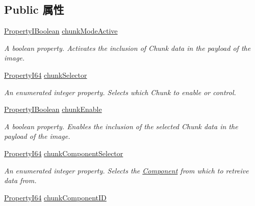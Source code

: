 \subsection*{Public 属性}
\begin{DoxyCompactItemize}
\item 
\hyperlink{group___common_interface_ga44f9437e24b21b6c93da9039ec6786aa}{Property\+I\+Boolean} \hyperlink{classmv_i_m_p_a_c_t_1_1acquire_1_1_gen_i_cam_1_1_chunk_data_control_aae91a9b1196e832dccef5e078a75c2ee}{chunk\+Mode\+Active}
\begin{DoxyCompactList}\small\item\em A boolean property. Activates the inclusion of Chunk data in the payload of the image. \end{DoxyCompactList}\item 
\hyperlink{group___common_interface_ga81749b2696755513663492664a18a893}{Property\+I64} \hyperlink{classmv_i_m_p_a_c_t_1_1acquire_1_1_gen_i_cam_1_1_chunk_data_control_afa89c2551ad7b82a5a6ce641cc169523}{chunk\+Selector}
\begin{DoxyCompactList}\small\item\em An enumerated integer property. Selects which Chunk to enable or control. \end{DoxyCompactList}\item 
\hyperlink{group___common_interface_ga44f9437e24b21b6c93da9039ec6786aa}{Property\+I\+Boolean} \hyperlink{classmv_i_m_p_a_c_t_1_1acquire_1_1_gen_i_cam_1_1_chunk_data_control_ae4448c564c23ae14648a81c74fdd2f6f}{chunk\+Enable}
\begin{DoxyCompactList}\small\item\em A boolean property. Enables the inclusion of the selected Chunk data in the payload of the image. \end{DoxyCompactList}\item 
\hyperlink{group___common_interface_ga81749b2696755513663492664a18a893}{Property\+I64} \hyperlink{classmv_i_m_p_a_c_t_1_1acquire_1_1_gen_i_cam_1_1_chunk_data_control_a5f1f17a1606e9ea9a5c660886422d5b7}{chunk\+Component\+Selector}
\begin{DoxyCompactList}\small\item\em An enumerated integer property. Selects the \hyperlink{classmv_i_m_p_a_c_t_1_1acquire_1_1_component}{Component} from which to retreive data from. \end{DoxyCompactList}\item 
\hyperlink{group___common_interface_ga81749b2696755513663492664a18a893}{Property\+I64} \hyperlink{classmv_i_m_p_a_c_t_1_1acquire_1_1_gen_i_cam_1_1_chunk_data_control_a303eb2c02211269edcdc7c1899270c73}{chunk\+Component\+I\+D}

\end{DoxyCompactItemize}

